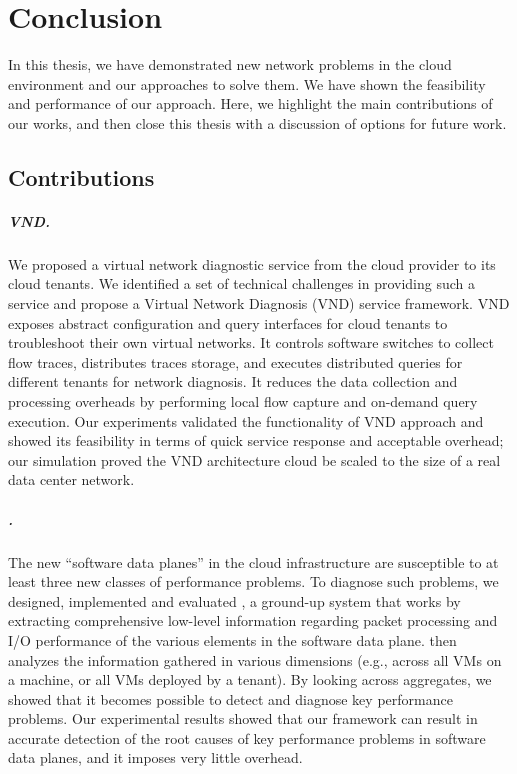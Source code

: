 \chapter{Conclusion}
\label{chap:conc}
In this thesis, we have demonstrated new network problems in the cloud environment
and our approaches to solve them. We have shown the feasibility and performance
of our approach. 
Here, we highlight the main contributions of our works, and then close this thesis with
a discussion of options for future work.
\section{Contributions}
\paragraph{VND.} We proposed a virtual network diagnostic service from the cloud provider
to its cloud tenants.
We identified a set of technical challenges in providing such a service and propose
a Virtual Network Diagnosis (VND) service framework.  VND exposes abstract
configuration and query interfaces for cloud tenants to troubleshoot
their own virtual networks. It controls software switches to collect
flow traces, distributes traces storage, and executes distributed
queries for different tenants for network diagnosis. It reduces the
data collection and processing overheads by performing local flow
capture and on-demand query execution. 
Our experiments validated the functionality of VND approach and showed its feasibility 
in terms of quick service response and acceptable overhead; our simulation
proved the VND architecture cloud be scaled to the size of a real data center network.
\paragraph{\Name.}
The new ``software data
planes'' in the cloud infrastructure are susceptible to at least three new classes of
performance problems. To diagnose such problems, we designed,
implemented and evaluated \Name, a ground-up system that works by
extracting comprehensive low-level information regarding packet
processing and I/O performance of the various elements in the
software data plane. \Name then analyzes the information gathered in
various dimensions (e.g., across all VMs on a machine, or all VMs
deployed by a tenant). By looking across aggregates, we showed that it
becomes possible to detect and diagnose key performance
problems. Our experimental results showed that our framework can result in
accurate detection of the root causes of key performance problems in
software data planes, and it imposes very little overhead.
